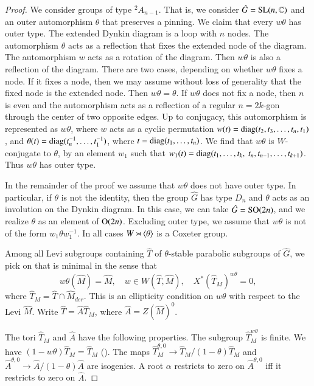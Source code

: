 \begin{proof}
We consider groups of type ${}^2A_{n-1}$.  That is, we consider $\hat
G = {\operatorname{SL}}(n,\mathbb{C})$ and an outer automorphism $\theta$ that
preserves a pinning.  We claim that every $w\theta$ has outer type.
The extended Dynkin diagram is a loop with $n$ nodes.  The
automorphism $\theta$ acts as a reflection that fixes the extended
node of the diagram.  The automorphism $w$ acts as a rotation of the
diagram.  Then $w \theta$ is also a reflection of the diagram.  There
are two cases, depending on whether $w\theta$ fixes a node.  If it
fixes a node, then we may assume without loss of generality that the
fixed node is the extended node.  Then $w\theta = \theta$.  If
$w\theta$ does not fix a node, then $n$ is even and the automorphism
acts as a reflection of a regular $n=2k$-gon through the center of two
opposite edges.  Up to conjugacy, this automorphism is represented as
$w\theta$, where $w $ acts as a cyclic permutation $w (t) =
{\operatorname{diag}}(t_2,t_3,\ldots,t_n,t_1)$, and $\theta(t) =
{\operatorname{diag}}(t_n^{-1},\ldots,t_1^{-1})$, where
$t={\operatorname{diag}}(t_1,\ldots,t_n)$.  We find that $w \theta$ is
$W$-conjugate to $\theta$, by an element $w_1$ such that $w_1(t) =
{\operatorname{diag}}(t_1,\ldots,t_k,\ t_n,t_{n-1},\ldots,t_{k+1})$. Thus
$w\theta$ has outer type.

In the remainder of the proof we assume that $w\theta$ does not have
outer type.  In particular, if $\theta$ is not the identity, then the
group $\hat G$ has type $D_n$ and $\theta$ acts as an involution on
the Dynkin diagram.  In this case, we can take $\hat G = {\operatorname{SO}}(2n)$, and
we realize $\theta$ as an element of ${\operatorname{O}}(2n)$.  Excluding outer type,
we assume that $w\theta$ is not of the form $w_1\theta w_1^{-1}$.  In
all cases $W\rtimes \langle{\theta}\rangle$ is a Coxeter group.

Among all Levi subgroups containing $\hat T$ of $\theta$-stable
parabolic subgroups of $\hat G$, we pick on that is minimal in the
sense that
\[
w\theta(\hat M) = \hat M,\quad w\in W(\hat T,\hat M),\quad X^*(\hat T_M)^{w\theta}=0,
\]
where $\hat T_M = \hat T\cap \hat M_{der}$.  This is an ellipticity
condition on $w\theta$ with respect to the Levi $\hat M$.
  Write $\hat T = \hat A\hat T_M$, where $\hat A = Z(\hat M)^0$.

The tori $\hat T_M$ and $\hat A$ have the following properties.  The
subgroup $\hat T_M^{w\theta}$ is finite.  We have $(1-w\theta)\hat T_M
= \hat T_M$ (\cite[Theorem 10.1]{steinberg1968endomorphisms}).  The
maps $\hat T_M^{\theta,0} \to \hat T_M/(1-\theta)\hat T_M$ and $\hat
A^{\theta,0}\to \hat A/(1-\theta)\hat A$ are isogenies.  A root $\alpha$
restricts to zero on $\hat A^{\theta,0}$ iff it restricts to zero on $\hat A$.


\end{proof}
